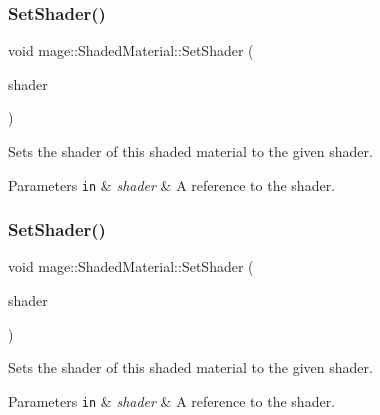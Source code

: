 \subsubsection{\texorpdfstring{Set\+Shader()}{SetShader()}\hspace{0.1cm}{\footnotesize\ttfamily [1/2]}}
{\footnotesize\ttfamily void mage\+::\+Shaded\+Material\+::\+Set\+Shader (\begin{DoxyParamCaption}\item[{const \hyperlink{structmage_1_1_combined_shader}{Combined\+Shader} \&}]{shader }\end{DoxyParamCaption})}

Sets the shader of this shaded material to the given shader.


\begin{DoxyParams}[1]{Parameters}
\mbox{\tt in}  & {\em shader} & A reference to the shader. \\
\hline
\end{DoxyParams}
\hypertarget{structmage_1_1_shaded_material_ae1c0fe052ef1cfb3c65ddf1ad9de8abb}{}\label{structmage_1_1_shaded_material_ae1c0fe052ef1cfb3c65ddf1ad9de8abb} 
\subsubsection{\texorpdfstring{Set\+Shader()}{SetShader()}\hspace{0.1cm}{\footnotesize\ttfamily [2/2]}}
{\footnotesize\ttfamily void mage\+::\+Shaded\+Material\+::\+Set\+Shader (\begin{DoxyParamCaption}\item[{\hyperlink{structmage_1_1_combined_shader}{Combined\+Shader} \&\&}]{shader }\end{DoxyParamCaption})}

Sets the shader of this shaded material to the given shader.


\begin{DoxyParams}[1]{Parameters}
\mbox{\tt in}  & {\em shader} & A reference to the shader. \\
\hline
\end{DoxyParams}
\hypertarget{structmage_1_1_shaded_material_ae9c4286f2802a30698863c9abe95e60d}{}\label{structmage_1_1_shaded_material_ae9c4286f2802a30698863c9abe95e60d} 

